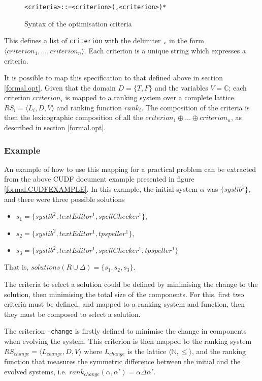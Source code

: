 \begin{figure}[h!]
\begin{center}
\begin{alltt}
<criteria> ::= <criterion> (, <criterion>)*
\end{alltt}
  \caption{Syntax of the optimisation criteria}
  \label{formal.optbnf}
\end{center}
\end{figure}

This defines a list of \verb+criterion+ with the delimiter \verb+,+ in the form $\langle criterion_1, \ldots, criterion_n \rangle$.
Each criterion is a unique string which expresses a criteria.

It is possible to map this specification to that defined above in section \ref{formal.opt}.
Given that the domain $D = \{T,F\}$ and the variables $V = \mathbb{C}$;
each criterion $criterion_i$ is mapped to a ranking system over a complete lattice $RS_i = \langle L_i,D,V \rangle$
and ranking function $rank_i$.
The composition of the criteria is then the lexicographic composition of all the $criterion_1 \oplus \ldots \oplus criterion_n$, as described in section \ref{formal.opt}.

\subsubsection{Example}
An example of how to use this mapping for a practical problem can be extracted from the above CUDF document example presented in figure \ref{formal.CUDFEXAMPLE}.
In this example, the initial system $\alpha$ was  $\{syslib^1\}$, and there were three possible solutions
\begin{itemize}
  \item $s_1 = \{syslib^2, textEditor^1, spellChecker^1\}$,
  \item $s_2 = \{syslib^2, textEditor^1, tpspeller^1\}$,
  \item $s_3 = \{syslib^2, textEditor^1, spellChecker^1, tpspeller^1\}$
\end{itemize}
That is, $solutions(R \cup \Delta) = \{s_1,s_2,s_3\}$.

The criteria to select a solution could be defined by minimising the change to the solution, then minimising the total size of the components.
For this, first two criteria must be defined, and mapped to a ranking system and function, then they must be composed to select a solution.

The criterion \verb+-change+ is firstly defined to minimise the change in components when evolving the system.
This criterion is then mapped to the ranking system $RS_{change} = \langle L_{change},D,V \rangle$ where  $L_{change}$ is the lattice $\langle \mathbb{N}, \leq \rangle$,
and the ranking function that measures the symmetric difference between the initial and the evolved systems, i.e. $rank_{change}(\alpha,\alpha') = \alpha \Delta \alpha'$.

